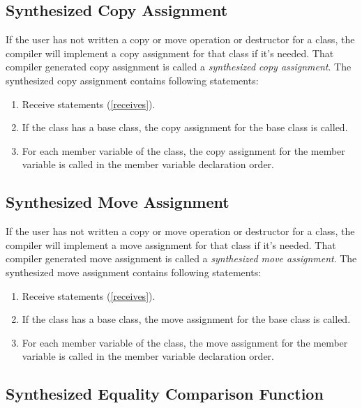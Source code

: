 \documentclass[a4paper,oneside,11pt]{book}
\theoremstyle{definition}
\begin{document}
\subsection{Synthesized Copy Assignment}

If the user has not written a copy or move operation or destructor for a class, the compiler will implement a copy assignment for that class if it's needed.
That compiler generated copy assignment is called a \emph{synthesized copy assignment}.
The synthesized copy assignment contains following statements:
\begin{enumerate}
\item
Receive statements (\ref{receives}).
\item
If the class has a base class, the copy assignment for the base class is called.
\item
For each member variable of the class, the copy assignment for the member variable is called in the member variable declaration order.
\end{enumerate}

\subsection{Synthesized Move Assignment}

If the user has not written a copy or move operation or destructor for a class, the compiler will implement a move assignment for that class if it's needed.
That compiler generated move assignment is called a \emph{synthesized move assignment}.
The synthesized move assignment contains following statements:
\begin{enumerate}
\item
Receive statements (\ref{receives}).
\item
If the class has a base class, the move assignment for the base class is called.
\item
For each member variable of the class, the move assignment for the member variable is called in the member variable declaration order.
\end{enumerate}

\subsection{Synthesized Equality Comparison Function}
\end{document}
